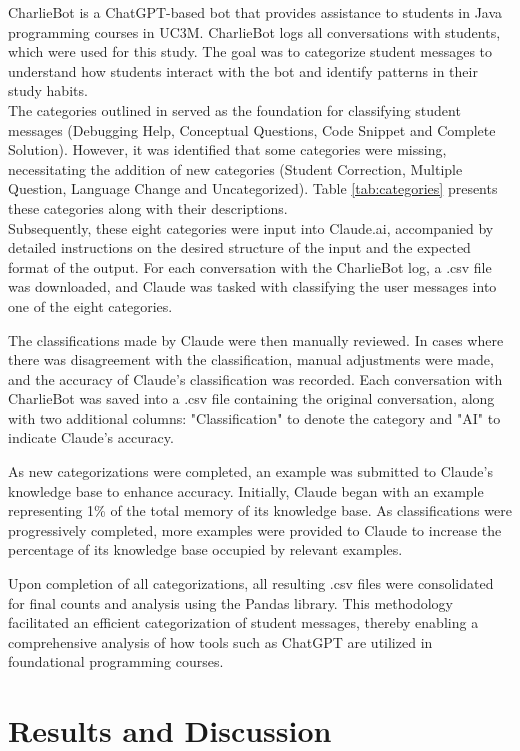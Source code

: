 \documentclass[conference]{IEEEtran}
\begin{document}
CharlieBot is a ChatGPT-based bot that provides assistance to students in
Java programming courses in UC3M. CharlieBot logs all conversations with
students, which were used for this study. The goal was to categorize student
messages to understand how students interact with the bot and identify patterns
in their study habits.
\\
The categories outlined in \cite{Ghimire24} served as the
foundation for classifying student messages (Debugging Help, Conceptual
Questions, Code Snippet and Complete Solution). However, it was identified that
some categories were missing, necessitating the addition of new categories
(Student Correction, Multiple Question, Language Change and Uncategorized). Table
\ref{tab:categories} presents these categories along with their descriptions.
\\
Subsequently, these eight categories were input into Claude.ai, accompanied by
detailed instructions on the desired structure of the input and the expected
format of the output. For each conversation with the CharlieBot log, a .csv file
was downloaded, and Claude was tasked with classifying the user messages into
one of the eight categories.

The classifications made by Claude were then manually reviewed. In cases where
there was disagreement with the classification, manual adjustments were made,
and the accuracy of Claude's classification was recorded. Each conversation
with CharlieBot was saved into a .csv file containing the original conversation,
along with two additional columns: "Classification" to denote the category and
"AI" to indicate Claude's accuracy.

As new categorizations were completed, an example was submitted to Claude's
knowledge base to enhance accuracy. Initially, Claude began with an example
representing 1\% of the total memory of its knowledge base. As classifications
were progressively completed, more examples were provided to Claude to increase
the percentage of its knowledge base occupied by relevant examples.

Upon completion of all categorizations, all resulting .csv files were consolidated
for final counts and analysis using the Pandas library. This methodology
facilitated an efficient categorization of student messages, thereby enabling
a comprehensive analysis of how tools such as ChatGPT are utilized in foundational
programming courses.

\section{Results and Discussion}
\end{document}
